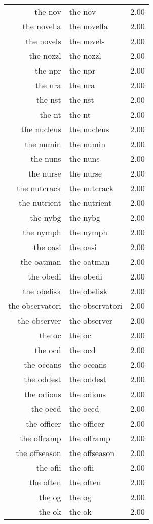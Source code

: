 \begin{table}[ht]
\begin{tabular}{rlr}
  the nov & the nov & 2.00 \\ 
  the novella & the novella & 2.00 \\ 
  the novels & the novels & 2.00 \\ 
  the nozzl & the nozzl & 2.00 \\ 
  the npr & the npr & 2.00 \\ 
  the nra & the nra & 2.00 \\ 
  the nst & the nst & 2.00 \\ 
  the nt & the nt & 2.00 \\ 
  the nucleus & the nucleus & 2.00 \\ 
  the numin & the numin & 2.00 \\ 
  the nuns & the nuns & 2.00 \\ 
  the nurse & the nurse & 2.00 \\ 
  the nutcrack & the nutcrack & 2.00 \\ 
  the nutrient & the nutrient & 2.00 \\ 
  the nybg & the nybg & 2.00 \\ 
  the nymph & the nymph & 2.00 \\ 
  the oasi & the oasi & 2.00 \\ 
  the oatman & the oatman & 2.00 \\ 
  the obedi & the obedi & 2.00 \\ 
  the obelisk & the obelisk & 2.00 \\ 
  the observatori & the observatori & 2.00 \\ 
  the observer & the observer & 2.00 \\ 
  the oc & the oc & 2.00 \\ 
  the ocd & the ocd & 2.00 \\ 
  the oceans & the oceans & 2.00 \\ 
  the oddest & the oddest & 2.00 \\ 
  the odious & the odious & 2.00 \\ 
  the oecd & the oecd & 2.00 \\ 
  the officer & the officer & 2.00 \\ 
  the offramp & the offramp & 2.00 \\ 
  the offseason & the offseason & 2.00 \\ 
  the ofii & the ofii & 2.00 \\ 
  the often & the often & 2.00 \\ 
  the og & the og & 2.00 \\ 
  the ok & the ok & 2.00 \\ 

\end{tabular}
\end{table}
